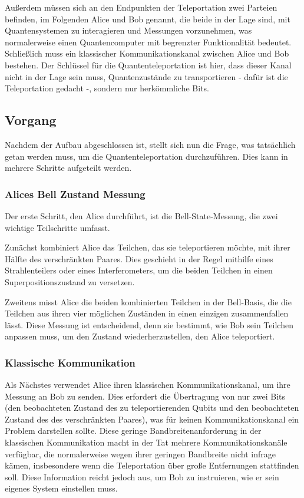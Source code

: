 Außerdem müssen sich an den Endpunkten der Teleportation zwei Parteien befinden, im Folgenden Alice und Bob genannt, die beide in der Lage sind, mit Quantensystemen zu interagieren und Messungen vorzunehmen, was normalerweise einen Quantencomputer mit begrenzter Funktionalität bedeutet.
Schließlich muss ein klassischer Kommunikationskanal zwischen Alice und Bob bestehen.
Der Schlüssel für die Quantenteleportation ist hier, dass dieser Kanal nicht in der Lage sein muss, Quantenzustände zu transportieren - dafür ist die Teleportation gedacht -, sondern nur herkömmliche Bits.


\subsection{Vorgang}\label{subsec:process}

Nachdem der Aufbau abgeschlossen ist, stellt sich nun die Frage, was tatsächlich getan werden muss, um die Quantenteleportation durchzuführen.
Dies kann in mehrere Schritte aufgeteilt werden.

\subsubsection{Alices Bell Zustand Messung}
Der erste Schritt, den Alice durchführt, ist die Bell-State-Messung, die zwei wichtige Teilschritte umfasst.

Zunächst kombiniert Alice das Teilchen, das sie teleportieren möchte, mit ihrer Hälfte des verschränkten Paares.
Dies geschieht in der Regel mithilfe eines Strahlenteilers oder eines Interferometers, um die beiden Teilchen in einen Superpositionszustand zu versetzen.

Zweitens misst Alice die beiden kombinierten Teilchen in der Bell-Basis, die die Teilchen aus ihren vier möglichen Zuständen in einen einzigen zusammenfallen lässt.
Diese Messung ist entscheidend, denn sie bestimmt, wie Bob sein Teilchen anpassen muss, um den Zustand wiederherzustellen, den
Alice teleportiert.
\subsubsection{Klassische Kommunikation}
Als Nächstes verwendet Alice ihren klassischen Kommunikationskanal, um ihre Messung an Bob zu senden.
Dies erfordert die Übertragung von nur zwei Bits (den beobachteten Zustand des zu teleportierenden Qubits und den beobachteten Zustand des
des verschränkten Paares), was für keinen Kommunikationskanal ein Problem darstellen sollte.
Diese geringe Bandbreitenanforderung in der klassischen Kommunikation macht in der Tat mehrere Kommunikationskanäle verfügbar,
die normalerweise wegen ihrer geringen Bandbreite nicht infrage kämen, insbesondere wenn die Teleportation über große
Entfernungen stattfinden soll.
Diese Information reicht jedoch aus, um Bob zu instruieren, wie er sein eigenes System einstellen muss.
